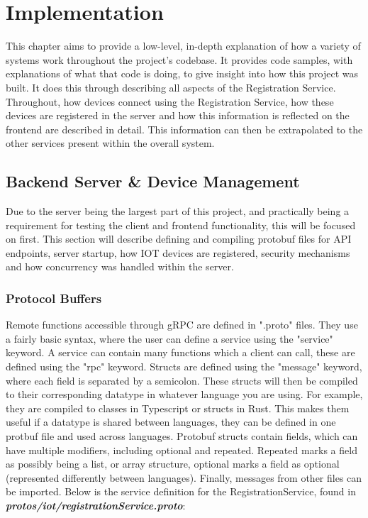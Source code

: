 \chapter{Implementation} \label{cha:implementation}
This chapter aims to provide a low-level, in-depth explanation of how a variety of systems work throughout the project's codebase. It provides code samples, with explanations of what that code is doing, to give insight into how this project was built. It does this through describing all aspects of the Registration Service. Throughout, how devices connect using the Registration Service, how these devices are registered in the server and how this information is reflected on the frontend are described in detail. This information can then be extrapolated to the other services present within the overall system.

\section{Backend Server \& Device Management} \label{sec:chapimpl:server}
Due to the server being the largest part of this project, and practically being a requirement for testing the client and frontend functionality, this will be focused on first. This section will describe defining and compiling protobuf files for API endpoints, server startup, how IOT devices are registered, security mechanisms and how concurrency was handled within the server. 

\subsection{Protocol Buffers} \label{sec:chapimpl:server:protoBufs}

Remote functions accessible through gRPC are defined in ".proto" files. They use a fairly basic syntax, where the user can define a service using the "service" keyword. A service can contain many functions which a client can call, these are defined using the "rpc" keyword. Structs are defined using the "message" keyword, where each field is separated by a semicolon. These structs will then be compiled to their corresponding datatype in whatever language you are using. For example, they are compiled to classes in Typescript or structs in Rust. This makes them useful if a datatype is shared between languages,  they can be defined in one protbuf file and used across languages. Protobuf structs contain fields, which can have multiple modifiers, including optional and repeated. Repeated marks a field as possibly being a list, or array structure, optional marks a field as optional (represented differently between languages). Finally, messages from other files can be imported. Below is the service definition for the RegistrationService, found in \textbf{\textit{protos/iot/registrationService.proto}}:

